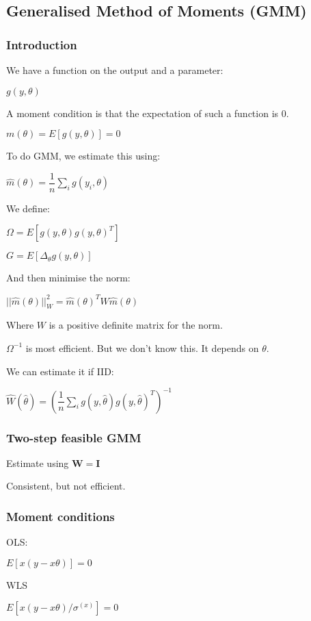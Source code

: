
\subsection{Generalised Method of Moments (GMM)}

\subsubsection{Introduction}

We have a function on the output and a parameter:

\(g(y, \theta )\)

A moment condition is that the expectation of such a function is \(0\).

\(m(\theta )=E[g(y, \theta )]=0\)

To do GMM, we estimate this using:

\(\hat m(\theta )=\dfrac{1}{n}\sum_ig(y_i, \theta )\)

We define:

\(\Omega = E[g(y, \theta )g(y, \theta)^T]\)

\(G=E[\Delta_\theta g(y, \theta)]\)

And then minimise the norm:

\(||\hat m(\theta )||^2_W=\hat m(\theta )^TW\hat m(\theta )\)

Where \(W\) is a positive definite matrix for the norm.

\(\Omega ^{-1}\) is most efficient. But we don't know this. It depends on \(\theta \).

We can estimate it if IID:

\(\hat W(\hat \theta )= (\dfrac{1}{n}\sum_i g(y, \hat \theta)g(y, \hat \theta)^T)^{-1}\)

\subsubsection{Two-step feasible GMM}

Estimate using \(\mathbf W=\mathbf I\)

Consistent, but not efficient.

\subsubsection{Moment conditions}

OLS:

\(E[x(y-x\theta)]=0\)

WLS

\(E[x(y-x\theta)/\sigma^(x)]=0\)

